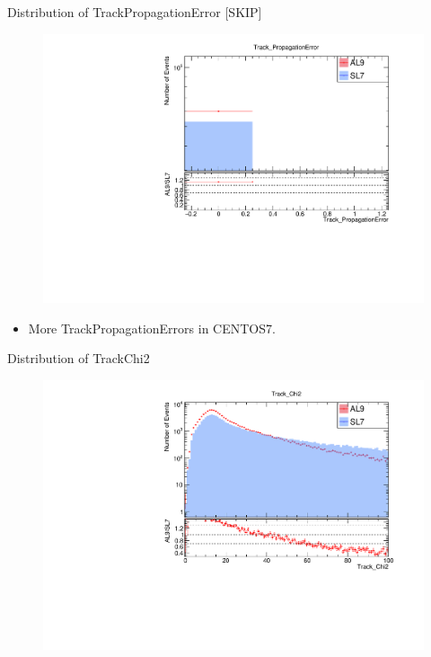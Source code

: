 \begin{frame}{Distribution of TrackPropagationError [SKIP]}
    \begin{figure}
        \includegraphics[width=0.9\linewidth]{output/Track_PropagationError.pdf}
    \end{figure}
    \vspace{-0.5cm}
    \begin{itemize}
        \item More TrackPropagationErrors in CENTOS7.
    \end{itemize}
\end{frame}

\begin{frame}{Distribution of TrackChi2}
    \begin{figure}
        \includegraphics[width=\linewidth]{./output/Track_Chi2.pdf}
    \end{figure}
\end{frame}

